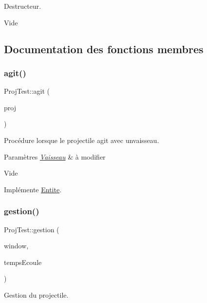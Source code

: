 Destructeur. 

Vide 

\subsection{Documentation des fonctions membres}
\mbox{\label{class_proj_test_a1a20ef0f16a8b58c653a1cf1544ef0b7}} 
\subsubsection{\texorpdfstring{agit()}{agit()}}
{\footnotesize\ttfamily Proj\+Test\+::agit (\begin{DoxyParamCaption}\item[{\hyperlink{class_entite}{Entite} \&}]{proj }\end{DoxyParamCaption})\hspace{0.3cm}{\ttfamily [virtual]}}



Procédure lorsque le projectile agit avec unvaisseau. 


\begin{DoxyParams}{Paramètres}
{\em \hyperlink{class_vaisseau}{Vaisseau}} & à modifier\\
\hline
\end{DoxyParams}
Vide 

Implémente \hyperlink{class_entite_a848ec47afac1d7ba970a2bcab5dc7b3b}{Entite}.

\mbox{\label{class_proj_test_aec696ef399dbe4a7d6cbca6d68196909}} 
\subsubsection{\texorpdfstring{gestion()}{gestion()}}
{\footnotesize\ttfamily Proj\+Test\+::gestion (\begin{DoxyParamCaption}\item[{sf\+::\+Render\+Window \&}]{window,  }\item[{sf\+::\+Time}]{temps\+Ecoule }\end{DoxyParamCaption})\hspace{0.3cm}{\ttfamily [virtual]}}



Gestion du projectile. 


